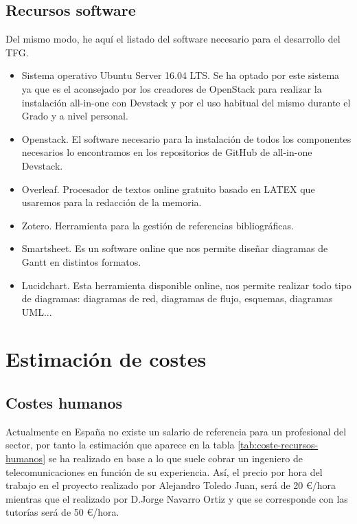 \subsection{Recursos software}
Del mismo modo, he aquí el listado del software necesario para el desarrollo del TFG.
\begin{itemize}
\item Sistema operativo Ubuntu Server 16.04 LTS. Se ha optado por este sistema ya que es el aconsejado por los creadores de OpenStack para realizar la instalación all-in-one con Devstack y por el uso habitual del mismo durante el Grado y a nivel personal.
\item Openstack. El software necesario para la instalación de todos los componentes necesarios lo encontramos en los  repositorios de GitHub de all-in-one Devstack.\cite{noauthor_devstack:_2018}
\item Overleaf. Procesador de textos online gratuito basado en LATEX que usaremos para la redacción de la memoria.
\item Zotero. Herramienta para la gestión de referencias bibliográficas.
\item Smartsheet. Es un software online que nos permite diseñar diagramas de Gantt en distintos formatos.
\item Lucidchart. Esta herramienta disponible online, nos permite realizar todo tipo de diagramas: diagramas de red, diagramas de flujo, esquemas, diagramas UML...
\end{itemize}

\section{Estimación de costes}

\subsection{Costes humanos}\label{subchap:costeshumanos}
Actualmente en España no existe un salario de referencia para un profesional del sector\cite{noauthor_boe.es_nodate}, por tanto la estimación que aparece en la tabla \ref{tab:coste-recursos-humanos} se ha realizado en base a lo que suele cobrar un ingeniero de telecomunicaciones en función de su experiencia. Así, el precio por hora del trabajo en el proyecto realizado por Alejandro Toledo Juan, será de 20 \euro/hora mientras que el realizado por D.Jorge Navarro Ortiz y que se corresponde con las tutorías será de 50 \euro/hora. 

